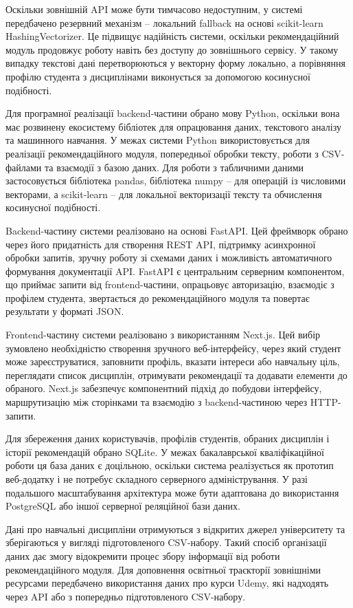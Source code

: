 \documentclass[
]{article}
\begin{document}
Оскільки зовнішній API може бути тимчасово недоступним, у системі
передбачено резервний механізм -- локальний fallback на основі
scikit-learn HashingVectorizer. Це підвищує надійність системи, оскільки
рекомендаційний модуль продовжує роботу навіть без доступу до
зовнішнього сервісу. У такому випадку текстові дані перетворюються у
векторну форму локально, а порівняння профілю студента з дисциплінами
виконується за допомогою косинусної подібності.

Для програмної реалізації backend-частини обрано мову Python, оскільки
вона має розвинену екосистему бібліотек для опрацювання даних,
текстового аналізу та машинного навчання. У межах системи Python
використовується для реалізації рекомендаційного модуля, попередньої
обробки тексту, роботи з CSV-файлами та взаємодії з базою даних. Для
роботи з табличними даними застосовується бібліотека pandas, бібліотека
numpy -- для операцій із числовими векторами, а scikit-learn -- для
локальної векторизації тексту та обчислення косинусної подібності.

Backend-частину системи реалізовано на основі FastAPI. Цей фреймворк
обрано через його придатність для створення REST API, підтримку
асинхронної обробки запитів, зручну роботу зі схемами даних і можливість
автоматичного формування документації API. FastAPI є центральним
серверним компонентом, що приймає запити від frontend-частини,
опрацьовує авторизацію, взаємодіє з профілем студента, звертається до
рекомендаційного модуля та повертає результати у форматі JSON.

Frontend-частину системи реалізовано з використанням Next.js. Цей вибір
зумовлено необхідністю створення зручного веб-інтерфейсу, через який
студент може зареєструватися, заповнити профіль, вказати інтереси або
навчальну ціль, переглядати список дисциплін, отримувати рекомендації та
додавати елементи до обраного. Next.js забезпечує компонентний підхід до
побудови інтерфейсу, маршрутизацію між сторінками та взаємодію з
backend-частиною через HTTP-запити.

Для збереження даних користувачів, профілів студентів, обраних дисциплін
і історії рекомендацій обрано SQLite. У межах бакалаврської
кваліфікаційної роботи ця база даних є доцільною, оскільки система
реалізується як прототип веб-додатку і не потребує складного серверного
адміністрування. У разі подальшого масштабування архітектура може бути
адаптована до використання PostgreSQL або іншої серверної реляційної
бази даних.

Дані про навчальні дисципліни отримуються з відкритих джерел
університету та зберігаються у вигляді підготовленого CSV-набору. Такий
спосіб організації даних дає змогу відокремити процес збору інформації
від роботи рекомендаційного модуля. Для доповнення освітньої траєкторії
зовнішніми ресурсами передбачено використання даних про курси Udemy, які
надходять через API або з попередньо підготовленого CSV-набору.
\end{document}
